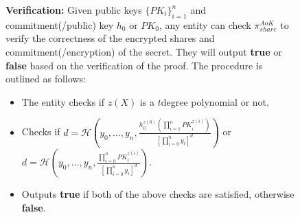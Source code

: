 \begin{figure}[ht]
{\begin{tcolorbox}[title=\textbf{$\Lambda_{RO}^{compact}$}, width=1.2\textwidth, colframe=blue!75!black, colback=blue!10, sharp corners]
        \vspace{0.5em}
        \textbf{Verification:}
            Given public keys $\{PK_i\}_{i=1}^n$ and commitment(/public) key $h_0\text{ or }PK_0$, 
            any entity can check $\pi_{share}^{AoK}$ to verify the correctness of the encrypted shares 
            and commitment(/encryption) of the secret. 
            They will output \textbf{true} or \textbf{false} based on the verification of the proof. The 
            procedure is outlined as follows:
        \begin{itemize}
            \item The entity checks if $z(X)$ is a $t$degree polynomial or not.
            \item Checks if $d=\mathcal{H}(y_0,\dots,y_n,\frac{h_0^{z(0)}(\prod_{i=1}^{n}PK_i^{z(i)})}{[\prod_{i=0}^{n}y_i]^d})$ or 
            $d=\mathcal{H}(y_0,\dots,y_n,\frac{\prod_{i=0}^{n}PK_i^{z(i)}}{[\prod_{i=0}^{n}y_i]^d})$.
            \item Outputs \textbf{true} if both of the above checks are satisfied, otherwise \textbf{false}.
        \end{itemize}


\end{tcolorbox}}
\end{figure}

